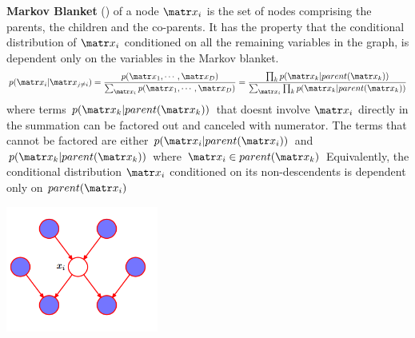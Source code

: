 \documentclass[11pt]{article}
\begin{document}
\begin{defn*}
    \textbf{Markov Blanket} () of a node $\bx_i$ is the set of nodes comprising the parents, the children and the co-parents. It has the property that the conditional distribution of $\bx_i$ conditioned on all the remaining variables in the graph, is dependent only on the variables in the Markov blanket. 
    \[
        p(\bx_i | \bx_{j\neq i})
        = \frac{p(\bx_1, \cdots, \bx_D)}{\sum_{\bx_i} p(\bx_1, \cdots, \bx_D)}
        = \frac{\prod_k p(\bx_k | parent(\bx_k))}{\sum_{\bx_i} \prod_k p(\bx_k | parent(\bx_k))}
    \]
    where terms $p(\bx_k|parent(\bx_k))$ that doesnt involve $\bx_i$ directly in the summation can be factored out and canceled with numerator. The terms that cannot be factored are either $p(\bx_i | parent(\bx_i))$ and $p(\bx_k|parent(\bx_k))$ where $\bx_i \in parent(\bx_k)$ Equivalently, the conditional distribution $\bx_i$ conditioned on its non-descendents is dependent only on $parent(\bx_i)$
    \begin{center}
        \includegraphics[width=5cm]{markov_blanket.png}
    \end{center}
\end{defn*}


 
\end{document}
